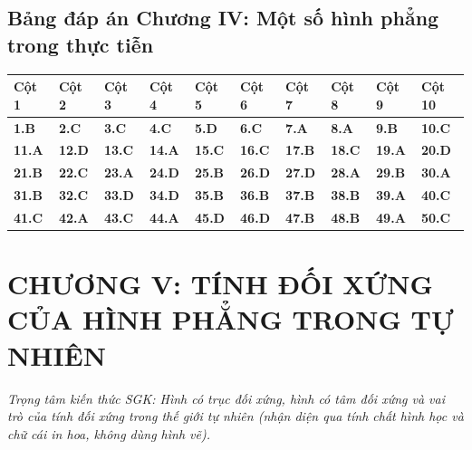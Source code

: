 \documentclass[11pt,a4paper]{article}
\begin{document}
\subsection*{\color{primary} Bảng đáp án Chương IV: Một số hình phẳng trong thực tiễn}
\begin{center}
\renewcommand{\arraystretch}{1.25}
\begin{tabularx}{\textwidth}{*{10}{>{\centering\arraybackslash}X}}
\toprule
\textbf{\color{primary} Cột 1} & \textbf{\color{primary} Cột 2} & \textbf{\color{primary} Cột 3} & \textbf{\color{primary} Cột 4} & \textbf{\color{primary} Cột 5} & \textbf{\color{primary} Cột 6} & \textbf{\color{primary} Cột 7} & \textbf{\color{primary} Cột 8} & \textbf{\color{primary} Cột 9} & \textbf{\color{primary} Cột 10} \\
\midrule
\textbf{1.B} & \textbf{2.C} & \textbf{3.C} & \textbf{4.C} & \textbf{5.D} & \textbf{6.C} & \textbf{7.A} & \textbf{8.A} & \textbf{9.B} & \textbf{10.C} \\
\rowcolor{rowtint} \textbf{11.A} & \textbf{12.D} & \textbf{13.C} & \textbf{14.A} & \textbf{15.C} & \textbf{16.C} & \textbf{17.B} & \textbf{18.C} & \textbf{19.A} & \textbf{20.D} \\
\textbf{21.B} & \textbf{22.C} & \textbf{23.A} & \textbf{24.D} & \textbf{25.B} & \textbf{26.D} & \textbf{27.D} & \textbf{28.A} & \textbf{29.B} & \textbf{30.A} \\
\rowcolor{rowtint} \textbf{31.B} & \textbf{32.C} & \textbf{33.D} & \textbf{34.D} & \textbf{35.B} & \textbf{36.B} & \textbf{37.B} & \textbf{38.B} & \textbf{39.A} & \textbf{40.C} \\
\textbf{41.C} & \textbf{42.A} & \textbf{43.C} & \textbf{44.A} & \textbf{45.D} & \textbf{46.D} & \textbf{47.B} & \textbf{48.B} & \textbf{49.A} & \textbf{50.C} \\
\bottomrule
\end{tabularx}
\end{center}\vspace{10pt}
\section*{\color{primary} CHƯƠNG V: TÍNH ĐỐI XỨNG CỦA HÌNH PHẲNG TRONG TỰ NHIÊN}
\textit{Trọng tâm kiến thức SGK: Hình có trục đối xứng, hình có tâm đối xứng và vai trò của tính đối xứng trong thế giới tự nhiên (nhận diện qua tính chất hình học và chữ cái in hoa, không dùng hình vẽ).}\par\vspace{4pt}
\end{document}
